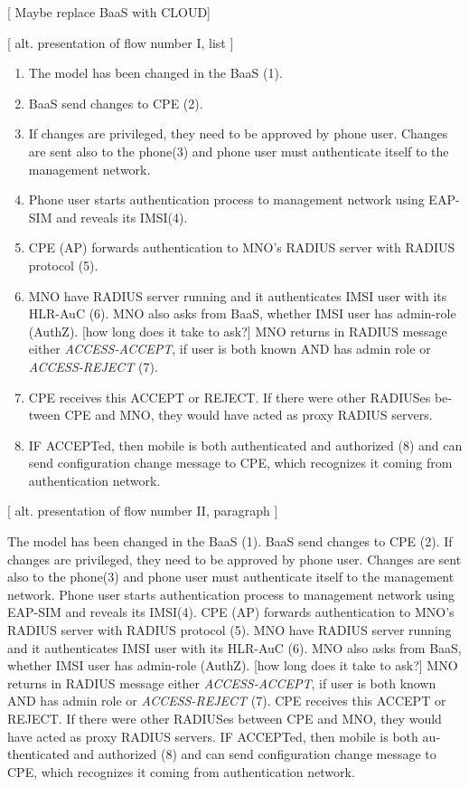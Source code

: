\documentclass[12pt,a4paper,english]{tutthesis}
\begin{document}
\begin{otherlanguage}{english}
[ Maybe replace BaaS with CLOUD] 


[ alt. presentation of flow number I, list ] 

\begin{enumerate}
\item The model has been changed in the BaaS (1).
\item BaaS send changes to CPE (2).
\item If changes are privileged, they need to be approved by phone user.
Changes are sent also to the phone(3) and phone user must authenticate
itself to the management network.
\item Phone user starts authentication process to management
network using EAP-SIM and reveals its IMSI(4).
\item CPE  (AP) forwards authentication to MNO's RADIUS server with
RADIUS protocol (5).
\item MNO have RADIUS server running and it authenticates IMSI user with
  its HLR-AuC (6).
MNO also asks from BaaS, whether IMSI user has admin-role (AuthZ). [how long does it take to ask?]
MNO returns in RADIUS message either \emph{ACCESS-ACCEPT}, if user is both known AND has admin role 
  or \emph{ACCESS-REJECT} (7).
\item CPE receives this ACCEPT or REJECT. If there were other RADIUSes
between CPE and MNO, they would have acted
as proxy RADIUS servers.
\item IF ACCEPTed, then mobile is both authenticated and authorized (8) and
can send configuration change message to CPE, which recognizes it
coming from authentication network.
\end{enumerate}



[ alt. presentation of flow number II, paragraph ] 

The model has been changed in the BaaS (1). BaaS send changes to CPE
(2).  If changes are privileged, they need to be approved by phone
user.  Changes are sent also to the phone(3) and phone user must
authenticate itself to the management network.  Phone user starts
authentication process to management network using EAP-SIM and reveals
its IMSI(4).  CPE (AP) forwards authentication to MNO's RADIUS server
with RADIUS protocol (5).  MNO have RADIUS server running and it
authenticates IMSI user with its HLR-AuC (6).  MNO also asks from
BaaS, whether IMSI user has admin-role (AuthZ). [how long does it take
to ask?]  MNO returns in RADIUS message either \emph{ACCESS-ACCEPT}, if
user is both known AND has admin role or \emph{ACCESS-REJECT} (7).  CPE
receives this ACCEPT or REJECT. If there were other RADIUSes between
CPE and MNO, they would have acted as proxy RADIUS servers.  IF
ACCEPTed, then mobile is both authenticated and authorized (8) and can
send configuration change message to CPE, which recognizes it coming
from authentication network.


\end{otherlanguage}
\end{document}
